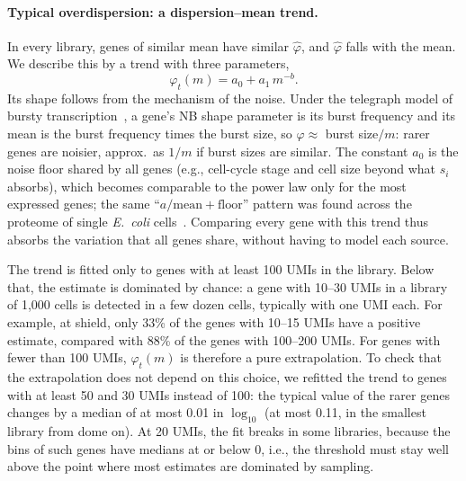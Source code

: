 \documentclass[11pt,a4paper]{article}
\begin{document}
\paragraph{Typical overdispersion: a dispersion--mean trend.} In every library, genes of similar mean have similar $\hat\varphi$, and $\hat\varphi$ falls with the mean. We describe this by a trend with three parameters,
\[
	\varphi_t(m) = a_0 + a_1\, m^{-b}.
\]
Its shape follows from the mechanism of the noise. Under the telegraph model of bursty transcription~\cite{raj2006bursting}, a gene's NB shape parameter is its burst frequency and its mean is the burst frequency times the burst size, so $\varphi \approx$ burst size$/m$: rarer genes are noisier, approx.~as $1/m$ if burst sizes are similar. The constant $a_0$ is the noise floor shared by all genes (e.g., cell-cycle stage and cell size beyond what $s_i$ absorbs), which becomes comparable to the power law only for the most expressed genes; the same ``$a/\text{mean} + \text{floor}$'' pattern was found across the proteome of single \emph{E.~coli} cells~\cite{taniguchi2010quantifying}. Comparing every gene with this trend thus absorbs the variation that all genes share, without having to model each source.

The trend is fitted only to genes with at least 100 UMIs in the library. Below that, the estimate is dominated by chance: a gene with 10--30 UMIs in a library of 1{,}000 cells is detected in a few dozen cells, typically with one UMI each. For example, at shield, only 33\% of the genes with 10--15 UMIs have a positive estimate, compared with 88\% of the genes with 100--200 UMIs. For genes with fewer than 100 UMIs, $\varphi_t(m)$ is therefore a pure extrapolation. To check that the extrapolation does not depend on this choice, we refitted the trend to genes with at least 50 and 30 UMIs instead of 100: the typical value of the rarer genes changes by a median of at most 0.01 in $\log_{10}$ (at most 0.11, in the smallest library from dome on). At 20 UMIs, the fit breaks in some libraries, because the bins of such genes have medians at or below 0, i.e., the threshold must stay well above the point where most estimates are dominated by sampling.
\end{document}
